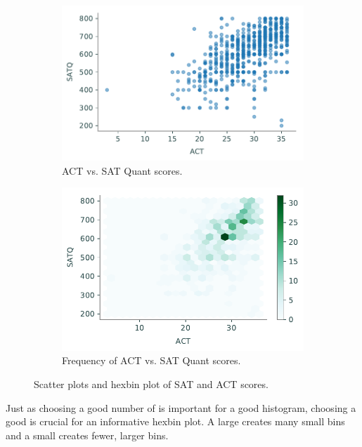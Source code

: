 \begin{figure}[H]
\captionsetup[subfigure]{justification=centering}
\centering
\begin{subfigure}{.49\textwidth}
    \includegraphics[width=\textwidth]{figures/scores_scatter.pdf}
    \caption{ACT vs. SAT Quant scores.}
    \label{fig:pandas-act-scatter}
\end{subfigure}
%
\begin{subfigure}{.49\textwidth}
    \includegraphics[width=\textwidth]{figures/scores_hexbin.pdf}
    \caption{Frequency of ACT vs. SAT Quant scores.}
    \label{fig:pandas-act-hexbin}
\end{subfigure}
\caption{Scatter plots and hexbin plot of SAT and ACT scores.}
\end{figure}

Just as choosing a good number of  is important for a good histogram, choosing a good  is crucial for an informative hexbin plot.
A large  creates many small bins and a small  creates fewer, larger bins.

